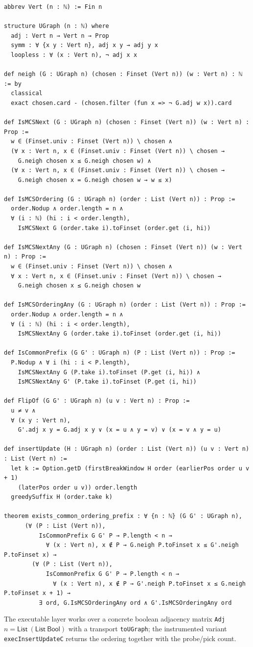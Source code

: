 \documentclass[11pt]{article}
\theoremstyle{definition}
\theoremstyle{remark}
\newcommand{\leanname}[1]{%
  \texttt{\begingroup\def\_{\textunderscore\allowbreak}#1\endgroup}}
\begin{document}
\begin{lstlisting}[style=lean]
abbrev Vert (n : ℕ) := Fin n

structure UGraph (n : ℕ) where
  adj : Vert n → Vert n → Prop
  symm : ∀ {x y : Vert n}, adj x y → adj y x
  loopless : ∀ (x : Vert n), ¬ adj x x

def neigh (G : UGraph n) (chosen : Finset (Vert n)) (w : Vert n) : ℕ := by
  classical
  exact chosen.card - (chosen.filter (fun x => ¬ G.adj w x)).card

def IsMCSNext (G : UGraph n) (chosen : Finset (Vert n)) (w : Vert n) : Prop :=
  w ∈ (Finset.univ : Finset (Vert n)) \ chosen ∧
  (∀ x : Vert n, x ∈ (Finset.univ : Finset (Vert n)) \ chosen →
    G.neigh chosen x ≤ G.neigh chosen w) ∧
  (∀ x : Vert n, x ∈ (Finset.univ : Finset (Vert n)) \ chosen →
    G.neigh chosen x = G.neigh chosen w → w ≤ x)

def IsMCSOrdering (G : UGraph n) (order : List (Vert n)) : Prop :=
  order.Nodup ∧ order.length = n ∧
  ∀ (i : ℕ) (hi : i < order.length),
    IsMCSNext G (order.take i).toFinset (order.get ⟨i, hi⟩)

def IsMCSNextAny (G : UGraph n) (chosen : Finset (Vert n)) (w : Vert n) : Prop :=
  w ∈ (Finset.univ : Finset (Vert n)) \ chosen ∧
  ∀ x : Vert n, x ∈ (Finset.univ : Finset (Vert n)) \ chosen →
    G.neigh chosen x ≤ G.neigh chosen w

def IsMCSOrderingAny (G : UGraph n) (order : List (Vert n)) : Prop :=
  order.Nodup ∧ order.length = n ∧
  ∀ (i : ℕ) (hi : i < order.length),
    IsMCSNextAny G (order.take i).toFinset (order.get ⟨i, hi⟩)

def IsCommonPrefix (G G' : UGraph n) (P : List (Vert n)) : Prop :=
  P.Nodup ∧ ∀ i (hi : i < P.length),
    IsMCSNextAny G (P.take i).toFinset (P.get ⟨i, hi⟩) ∧
    IsMCSNextAny G' (P.take i).toFinset (P.get ⟨i, hi⟩)

def FlipOf (G G' : UGraph n) (u v : Vert n) : Prop :=
  u ≠ v ∧
  ∀ (x y : Vert n),
    G'.adj x y = G.adj x y ∨ (x = u ∧ y = v) ∨ (x = v ∧ y = u)

def insertUpdate (H : UGraph n) (order : List (Vert n)) (u v : Vert n) : List (Vert n) :=
  let k := Option.getD (firstBreakWindow H order (earlierPos order u v + 1)
    (laterPos order u v)) order.length
  greedySuffix H (order.take k)

theorem exists_common_ordering_prefix : ∀ {n : ℕ} (G G' : UGraph n),
      (∀ (P : List (Vert n)),
          IsCommonPrefix G G' P → P.length < n →
            ∀ (x : Vert n), x ∉ P → G.neigh P.toFinset x ≤ G'.neigh P.toFinset x) →
        (∀ (P : List (Vert n)),
            IsCommonPrefix G G' P → P.length < n →
              ∀ (x : Vert n), x ∉ P → G'.neigh P.toFinset x ≤ G.neigh P.toFinset x + 1) →
          ∃ ord, G.IsMCSOrderingAny ord ∧ G'.IsMCSOrderingAny ord
\end{lstlisting}

The executable layer works over a concrete boolean adjacency matrix
\leanname{Adj}\ $n = \mathsf{List}\ (\mathsf{List}\ \mathsf{Bool})$ with a
transport \leanname{toUGraph}; the instrumented variant
\leanname{execInsertUpdateC} returns the ordering together with the probe/pick
count.



\end{document}
